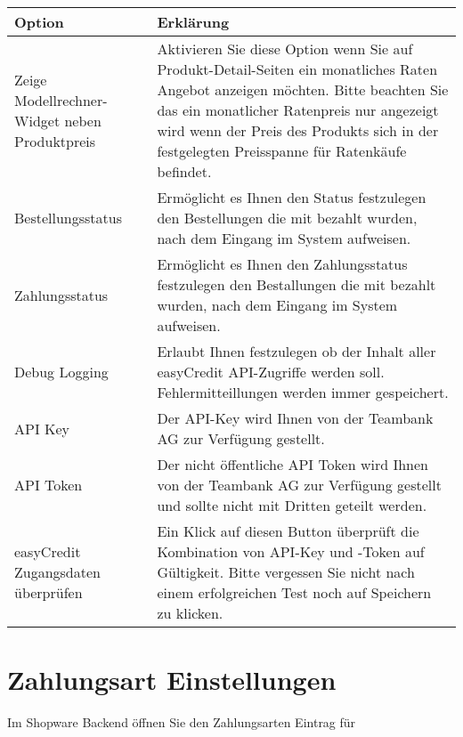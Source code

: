 \documentclass[a4paper,10pt,openany,oneside,ngerman]{sphinxmanual}
\begin{document}
\noindent{}


\begin{savenotes}\sphinxattablestart
\centering
\begin{tabulary}{\linewidth}[t]{|p{85pt}|J|}
\hline

Option
&
Erklärung
\\
\hline
Zeige Modellrechner-Widget neben Produktpreis
&
Aktivieren Sie diese Option wenn Sie auf Produkt-Detail-Seiten ein monatliches Raten Angebot anzeigen möchten. Bitte beachten Sie das ein monatlicher Ratenpreis nur angezeigt wird wenn der Preis des Produkts sich in der festgelegten Preisspanne für Ratenkäufe befindet.
\\
\hline
Bestellungsstatus
&
Ermöglicht es Ihnen den Status festzulegen den Bestellungen die mit  bezahlt wurden, nach dem Eingang im System aufweisen.
\\
\hline
Zahlungsstatus
&
Ermöglicht es Ihnen den Zahlungsstatus festzulegen den Bestallungen die mit  bezahlt wurden, nach dem Eingang im System aufweisen.
\\
\hline
Debug Logging
&
Erlaubt Ihnen festzulegen ob der Inhalt aller easyCredit API-Zugriffe werden soll. Fehlermitteillungen werden immer gespeichert.
\\
\hline
API Key
&
Der API-Key wird Ihnen von der Teambank AG zur Verfügung gestellt.
\\
\hline
API Token
&
Der nicht öffentliche API Token wird Ihnen von der Teambank AG zur Verfügung gestellt und sollte nicht mit Dritten geteilt werden.
\\
\hline
easyCredit Zugangsdaten überprüfen
&
Ein Klick auf diesen Button überprüft die Kombination von API-Key und -Token auf Gültigkeit. Bitte vergessen Sie nicht nach einem erfolgreichen Test noch auf Speichern zu klicken.
\\
\hline
\end{tabulary}
\par
\sphinxattableend\end{savenotes}


\section{Zahlungsart Einstellungen}
\label{\detokenize{configuration:zahlungsart-einstellungen}}
Im Shopware Backend öffnen Sie den Zahlungsarten Eintrag für 
\begin{quote}

\end{quote}
\end{document}
